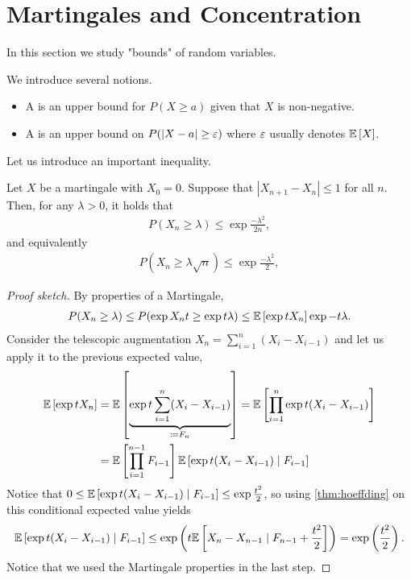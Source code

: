 \section{Martingales and Concentration}
In this section we study "bounds" of random variables.
\begin{definition}
    We introduce several notions.
    \begin{itemize}
        \item A  is an upper bound for $P(X \geq a)$ given that $X$ is non-negative.
        \item A  is an upper bound on $P(|X-a| \geq \varepsilon)$
              where $\varepsilon$ usually denotes $\mathbb{E}\left[X\right]$.
    \end{itemize}
\end{definition}
Let us introduce an important inequality.
\begin{theorem}
    Let $X$ be a martingale with $X_0 = 0$.
    Suppose that $|X_{n+1} - X_n| \leq 1$ for all $n$.
    Then, for any $\lambda > 0$, it holds that
    \begin{align}
        P(X_n \geq \lambda) \leq \exp{\frac{-\lambda^2}{2n}},
    \end{align}
    and equivalently
    \begin{align}
        P(X_n \geq \lambda \sqrt{n}) \leq \exp{\frac{-\lambda^2}{2}},
    \end{align}
\end{theorem}
\begin{proof}[Proof sketch]
    By properties of a Martingale,
    \begin{align}
        P(X_n \geq \lambda) \leq P(\exp{X_nt} \geq \exp{t\lambda}) \leq \mathbb{E}\left[\exp{tX_n}\right]\exp{-t\lambda}.
    \end{align}
    Consider the telescopic augmentation $X_n = \sum_{i=1}^n (X_i - X_{i-1})$
    and let us apply it to the previous expected value,
    \begin{align}
        \mathbb{E}\left[\exp{tX_n}\right] & = \mathbb{E}\left[\underbrace{\exp{t \sum_{i=1}^n (X_i - X_{i-1})}}_{\coloneqq F_n}\right] = \mathbb{E}\left[\prod_{i=1}^{n}\exp{t(X_i - X_{i-1})}\right] \\
                            & = \mathbb{E}\left[\prod_{i=1}^{n-1}F_{i-1}\right]\mathbb{E}\left[\exp{t(X_i - X_{i-1})} \mid F_{i-1} \right]
    \end{align}
    Notice that $0 \leq \mathbb{E}\left[\exp{t(X_i - X_{i-1})} \mid F_{i-1} \right] \leq \exp{\frac{t^2}{2}}$,
    so using \autoref{thm:hoeffding} on this conditional expected value yields
    \begin{align}
        \mathbb{E}\left[\exp{t(X_i - X_{i-1})} \mid F_{i-1} \right] \leq \exp\left(t\mathbb{E}\left[X_n- X_{n-1} \mid F_{n-1} + \frac{t^2}{2}\right]\right) = \exp\left(\frac{t^2}{2}\right).
    \end{align}
    Notice that we used the Martingale properties in the last step.
\end{proof}
